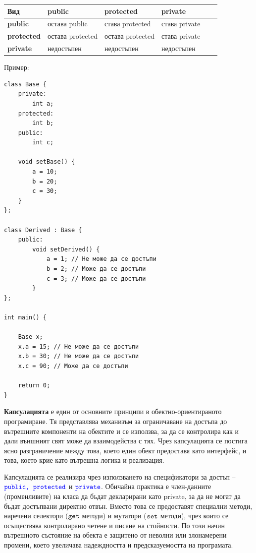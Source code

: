 \documentclass{article}
\begin{document}
\begin{center}
    \begin{tabularx}{1\textwidth}{ 
        | >{\centering\arraybackslash}X 
        | >{\centering\arraybackslash}X 
        | >{\centering\arraybackslash}X 
        | >{\centering\arraybackslash}X
        | >{\centering\arraybackslash}X
        | >{\centering\arraybackslash}X |}
    \hline
    \textbf{Вид} & \textbf{public} & \textbf{protected} & \textbf{private} \\
    \hline
    \textbf{public} & остава public & става protected & става private\\
    \hline
    \textbf{protected} & остава protected & остава protected & става private\\
    \hline
    \textbf{private} & недостъпен & недостъпен & недостъпен \\
    \hline
    \end{tabularx}
\end{center}
Пример:
\begin{lstlisting}[style=cpp]
class Base {
    private:
        int a;
    protected:
        int b;
    public:
        int c;
    
    void setBase() {
        a = 10;
        b = 20;
        c = 30;
    }
};

class Derived : Base {
    public:
        void setDerived() {
            a = 1; // Не може да се достъпи
            b = 2; // Може да се достъпи
            c = 3; // Може да се достъпи
        }
};

int main() {

    Base x;
    x.a = 15; // Не може да се достъпи
    x.b = 30; // Не може да се достъпи
    x.c = 90; // Може да се достъпи

    return 0;
}
\end{lstlisting}
\textbf{Капсулацията} е един от основните принципи в обектно-ориентираното програмиране. Тя представлява механизъм за ограничаване на достъпа до
вътрешните компоненти на обектите и се използва, за да се контролира как и дали външният свят може да взаимодейства с тях. Чрез капсулацията
се постига ясно разграничение между това, което един обект предоставя като интерфейс, и това, което крие като вътрешна логика и реализация.

Капсулацията се реализира чрез използването на спецификатори за достъп – $\textcolor{blue}{\texttt{public, protected}}$ и $\textcolor{blue}{\texttt{private}}$. Обичайна практика е член-данните
(променливите) на класа да бъдат декларирани като private, за да не могат да бъдат достъпвани директно отвън. Вместо това се предоставят
специални методи, наречени селектори ($\textcolor{black}{\texttt{get}}$ методи) и мутатори ($\textcolor{black}{\texttt{set}}$ методи), чрез които се осъществява контролирано четене и писане на стойности.
По този начин вътрешното състояние на обекта е защитено от неволни или злонамерени промени, което увеличава надеждността и предсказуемостта на
програмата.
\end{document}

